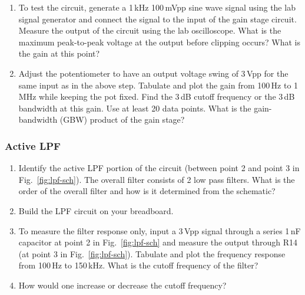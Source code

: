 \documentclass[letterpaper, 11pt]{article}
\begin{document}
\begin{enumerate}
	\item To test the circuit, generate a 1\,kHz 100\,mVpp sine wave signal using the lab signal generator and connect the signal to the input of the gain stage circuit. Measure the output of the circuit using the lab oscilloscope. What is the maximum peak-to-peak voltage at the output before clipping occurs? What is the gain at this point?
	
	\item Adjust the potentiometer to have an output voltage swing of 3\,Vpp for the same input as in the above step. 
	Tabulate and plot the gain from 100\,Hz to 1\,MHz while keeping the pot fixed. Find the 3\,dB cutoff frequency or the 3\,dB bandwidth at this gain. Use at least 20 data points. What is the gain-bandwidth (GBW) product of the gain stage? 
	

\end{enumerate}

\subsubsection{Active LPF}
\begin{enumerate}
	\item Identify the active LPF portion of the circuit (between point 2 and point 3 in Fig.~\ref{fig:lpf-sch}). The overall filter consists of 2 low pass filters. What is the order of the overall filter and how is it determined from the schematic?
	
	\item Build the LPF circuit on your breadboard. 
	
	\item To measure the filter response only, input a 3\,Vpp signal through a series 1\,nF capacitor at point 2 in Fig.~\ref{fig:lpf-sch} and measure the output through R14 (at point 3 in Fig.~\ref{fig:lpf-sch}). Tabulate and plot the frequency response from 100\,Hz to 150\,kHz. What is the cutoff frequency of the filter?
	
	\item How would one increase or decrease the cutoff frequency?
	
\end{enumerate}
\end{document}
